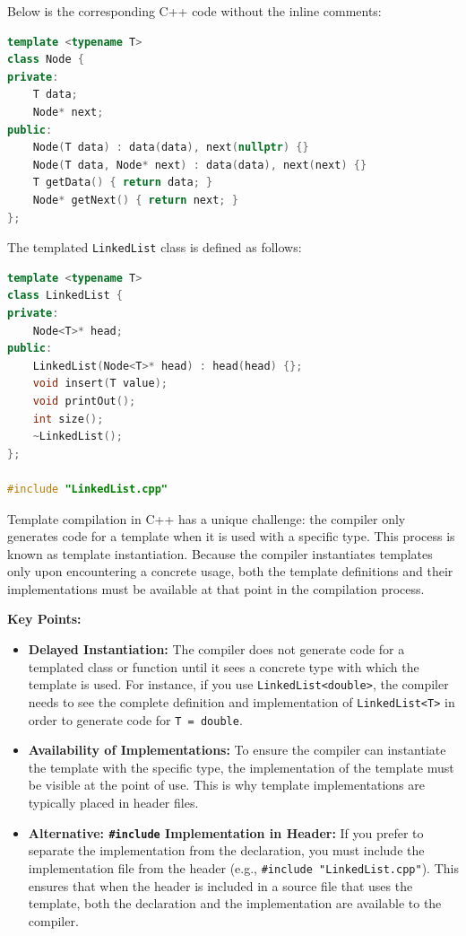 \documentclass{report}
\begin{document}
\bigskip

Below is the corresponding C++ code without the inline comments:

\begin{lstlisting}[language=C++]
template <typename T>
class Node {
private:
	T data;
	Node* next;
public:
	Node(T data) : data(data), next(nullptr) {}
	Node(T data, Node* next) : data(data), next(next) {}
	T getData() { return data; }
	Node* getNext() { return next; }
};
\end{lstlisting}

The templated \texttt{LinkedList} class is defined as follows:
\begin{lstlisting}[language=C++]
template <typename T>
class LinkedList {
private:
    Node<T>* head;
public:
    LinkedList(Node<T>* head) : head(head) {};
    void insert(T value);
    void printOut();
    int size();
    ~LinkedList();
};

#include "LinkedList.cpp"
\end{lstlisting}


Template compilation in C++ has a unique challenge: the compiler only generates code for a template when it is used with a specific type. This process is known as template instantiation. Because the compiler instantiates templates only upon encountering a concrete usage, both the template definitions and their implementations must be available at that point in the compilation process.

\bigskip

\textbf{Key Points:}
\begin{itemize}
	\item \textbf{Delayed Instantiation:}
	      The compiler does not generate code for a templated class or function until it sees a concrete type with which the template is used. For instance, if you use \texttt{LinkedList<double>}, the compiler needs to see the complete definition and implementation of \texttt{LinkedList<T>} in order to generate code for \texttt{T = double}.
	\item \textbf{Availability of Implementations:}
	      To ensure the compiler can instantiate the template with the specific type, the implementation of the template must be visible at the point of use. This is why template implementations are typically placed in header files.
	\item \textbf{Alternative: \texttt{\#include} Implementation in Header:}
	      If you prefer to separate the implementation from the declaration, you must include the implementation file from the header (e.g., \texttt{\#include "LinkedList.cpp"}). This ensures that when the header is included in a source file that uses the template, both the declaration and the implementation are available to the compiler.
\end{itemize}
\end{document}
